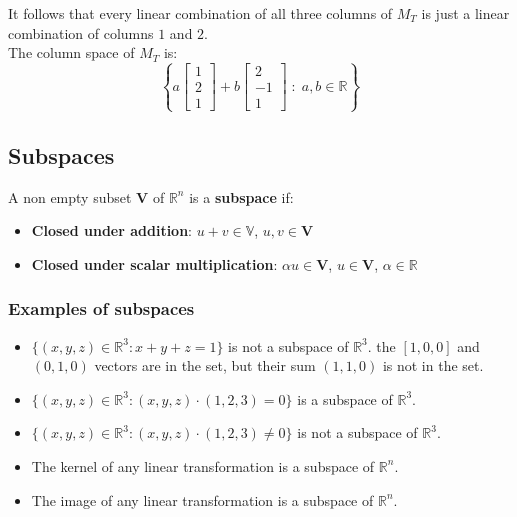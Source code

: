 \documentclass[a4paper, 9pt]{extarticle}
\begin{document}
It follows that every linear combination of all three columns of $M_T$ is just a linear combination of columns $1$ and $2$. \\[2ex]
The column space of $M_T$ is:
$$\left\{
  a\begin{bmatrix}
    1 \\
    2 \\
    1
  \end{bmatrix}
  +
  b \begin{bmatrix}
    2  \\
    -1 \\
    1
  \end{bmatrix} \; : \; a,b \in \mathbb{R}
  \right\}
$$
\subsection{Subspaces}
\begin{definitionbox}{}{}
  A non empty subset $\textbf{V}$ of $\mathbb{R}^n$ is a \textbf{subspace} if:
  \begin{itemize}
    \item \textbf{Closed under addition}: $u +v \in \mathbb{V}$, $u, v \in \textbf{V}$
    \item \textbf{Closed under scalar multiplication}: $\alpha u \in \textbf{V}$, $u \in \textbf{V}$, $\alpha \in \mathbb{R}$
  \end{itemize}
\end{definitionbox}
\subsubsection*{Examples of subspaces}
\begin{itemize}
  \item $\{(x,y,z) \in \mathbb{R}^3 : x + y + z = 1\}$ is not a subspace of $\mathbb{R}^3$. the $[1,0,0]$ and $(0,1,0)$ vectors are in the set, but their sum $(1,1,0)$ is not in the set.
  \item $\{(x,y,z) \in \mathbb{R}^3 : (x,y,z) \cdot (1,2,3) = 0\}$ is a subspace of $\mathbb{R}^3$.
  \item $\{(x,y,z) \in \mathbb{R}^3 : (x,y,z) \cdot (1,2,3) \neq 0\}$ is not a subspace of $\mathbb{R}^3$.
  \item The kernel of any linear transformation is a subspace of $\mathbb{R}^n$.
  \item The image of any linear transformation is a subspace of $\mathbb{R}^n$.
\end{itemize}
\end{document}
